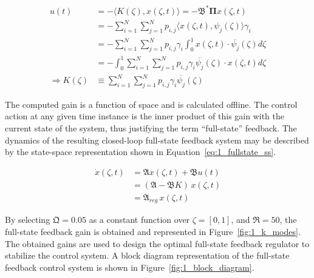 \begin{equation} \label{eq:1_fullstate_gain}
    \begin{aligned}
        u(t) &= - \langle {K}(\zeta), {x}(\zeta, t) \rangle = - \mathfrak{B}^* \mathbf{\Pi} {x}(\zeta, t) \\
        &= - \sum_{i=1}^N\sum_{j=1}^N p_{i,j} \langle {x}(\zeta, t), {\psi_j}(\zeta) \rangle \gamma_i \\
        &= - \sum_{i=1}^N\sum_{j=1}^N p_{i,j} \gamma_i \int_0^1 {x}(\zeta, t) \cdot \overline{{\psi_j}}(\zeta) d\zeta \\
        &= - \int_0^1 \sum_{i=1}^N\sum_{j=1}^N p_{i,j} \gamma_i \overline{{\psi_j}}(\zeta) \cdot {x}(\zeta, t) d\zeta \\
        \Rightarrow {K}(\zeta) &\equiv \sum_{i=1}^N\sum_{j=1}^N p_{i,j} \gamma_i \overline{{\psi_j}}(\zeta)
    \end{aligned}
\end{equation}

The computed gain is a function of space and is calculated offline. The control action at any given time instance is the inner product of this gain with the current state of the system, thus justifying the term ``full-state'' feedback. The dynamics of the resulting closed-loop full-state feedback system may be described by the state-space representation shown in Equation~\ref{eq:1_fullstate_ss}.

\begin{equation}
    \begin{aligned} \label{eq:1_fullstate_ss}
        \dot{x}(\zeta, t) &= \mathfrak{A} {x}(\zeta, t) + \mathfrak{B} u(t) \\
        &= (\mathfrak{A} - \mathfrak{B} {K}) \, {x}(\zeta, t) \\
        &= \mathfrak{A}_{reg} \, {x}(\zeta, t)
    \end{aligned}
\end{equation}

By selecting $\mathfrak{Q} = 0.05$ as a constant function over $\zeta = [0,1]$, and $\mathfrak{R} = 50$, the full-state feedback gain is obtained and represented in Figure~\ref{fig:1_k_modes}. The obtained gains are used to design the optimal full-state feedback regulator to stabilize the control system. A block diagram representation of the full-state feedback control system is shown in Figure~\ref{fig:1_block_diagram}.

